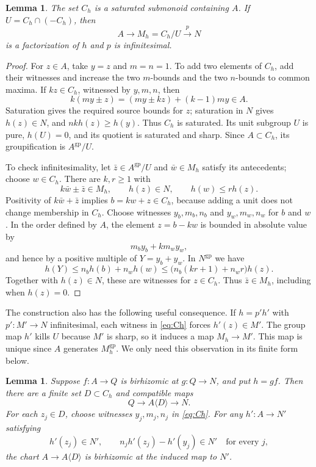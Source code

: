 \documentclass[11pt]{article}
\newtheorem{lemma}[theorem]{Lemma}
\theoremstyle{definition}
\theoremstyle{remark}
\newcommand{\gp}{\mathrm{gp}}
\begin{document}
\begin{lemma}\label{lem:infinitesimal}
The set $C_h$ is a saturated submonoid containing $A$. If $U=C_h\cap(-C_h)$, then
\[
 A\longrightarrow M_h=C_h/U\xrightarrow{p}N
\]
is a factorization of $h$ and $p$ is infinitesimal.
\end{lemma}

\begin{proof}
For $z\in A$, take $y=z$ and $m=n=1$. To add two elements of $C_h$, add their witnesses and increase the two $m$-bounds and the two $n$-bounds to common maxima. If $kz\in C_h$, witnessed by $y,m,n$, then
\[
 k(my\pm z)=(my\pm kz)+(k-1)my\in A.
\]
Saturation gives the required source bounds for $z$; saturation in $N$ gives $h(z)\in N$, and $nkh(z)\geq h(y)$. Thus $C_h$ is saturated. Its unit subgroup $U$ is pure, $h(U)=0$, and its quotient is saturated and sharp. Since $A\subset C_h$, its groupification is $A^{\gp}/U$.

To check infinitesimality, let $\bar z\in A^{\gp}/U$ and $\bar w\in M_h$ satisfy its antecedents; choose $w\in C_h$. There are $k,r\geq1$ with
\[
 k\bar w\pm\bar z\in M_h,\qquad
 h(z)\in N,\qquad h(w)\leq rh(z).
\]
Positivity of $k\bar w+\bar z$ implies $b=kw+z\in C_h$, because adding a unit does not change membership in $C_h$. Choose witnesses $y_b,m_b,n_b$ and $y_w,m_w,n_w$ for $b$ and $w$. In the order defined by $A$, the element $z=b-kw$ is bounded in absolute value by
\[
 m_by_b+km_wy_w,
\]
and hence by a positive multiple of $Y=y_b+y_w$. In $N^{\gp}$ we have
\[
 h(Y)\leq n_bh(b)+n_wh(w)
 \leq\bigl(n_b(kr+1)+n_wr\bigr)h(z).
\]
Together with $h(z)\in N$, these are witnesses for $z\in C_h$. Thus $\bar z\in M_h$, including when $h(z)=0$.
\end{proof}


The construction also has the following useful consequence. If $h=p'h'$ with $p':M'\to N$ infinitesimal, each witness in \eqref{eq:Ch} forces $h'(z)\in M'$. The group map $h'$ kills $U$ because $M'$ is sharp, so it induces a map $M_h\to M'$. This map is unique since $A$ generates $M_h^{\gp}$. We only need this observation in its finite form below.

\begin{lemma}\label{lem:certificates}
Suppose $f:A\to Q$ is birhizomic at $g:Q\to N$, and put $h=gf$. Then there are a finite set $D\subset C_h$ and compatible maps
\[
 Q\longrightarrow A\langle D\rangle\longrightarrow N.
\]
For each $z_j\in D$, choose witnesses $y_j,m_j,n_j$ in \eqref{eq:Ch}. For any $h':A\to N'$ satisfying
\begin{equation}\label{eq:certificate}
 h'(z_j)\in N',\qquad n_jh'(z_j)-h'(y_j)\in N'
 \quad\text{for every }j,
\end{equation}
the chart $A\to A\langle D\rangle$ is birhizomic at the induced map to $N'$.
\end{lemma}
\end{document}
